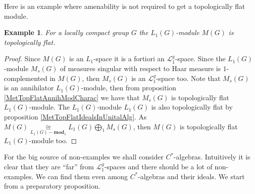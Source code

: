 \documentclass[12pt]{article}
\newtheorem{example}[theorem]{Example}
\newcommand{\isom}[1]{\mathop{\mathbin{\cong}}\limits_{#1}}
\begin{document}
Here is an example where amenability is not required to get a topologically flat module.

\begin{example} For a locally compact group $G$ the $L_1(G)$-module $M(G)$ is topologically flat.
\end{example}
\begin{proof}
Since $M(G)$ is an $L_1$-space it is a fortiori an $\mathcal{L}_1^g$-space. Since the $L_1(G)$-module $M_s(G)$ of measures singular with respect to Haar measure is $1$-complemented in $M(G)$, then $M_s(G)$ is an $\mathcal{L}_1^g$-space too. Note that $M_s(G)$ is an annihilator $L_1(G)$-module, then from proposition \ref{MetTopFlatAnnihModCharac} we have that $M_s(G)$ is topologically flat $L_1(G)$-module. The $L_1(G)$-module $L_1(G)$ is also topologically flat by proposition \ref{MetTopFlatIdealsInUnitalAlg}. As $M(G)\isom{L_1(G)-\mathbf{mod}_1}L_1(G)\bigoplus_1 M_s(G)$, then $M(G)$ is topologically flat $L_1(G)$-module too.
\end{proof}

For the big source of non-examples we shall consider $C^*$-algebras. Intuitively it is clear that they are ``far'' from $\mathcal{L}_1^g$-spaces and there should be a lot of non-examples. We can find them even among $C^*$-algebras and their ideals. We start from a preparatory proposition.
\end{document}
